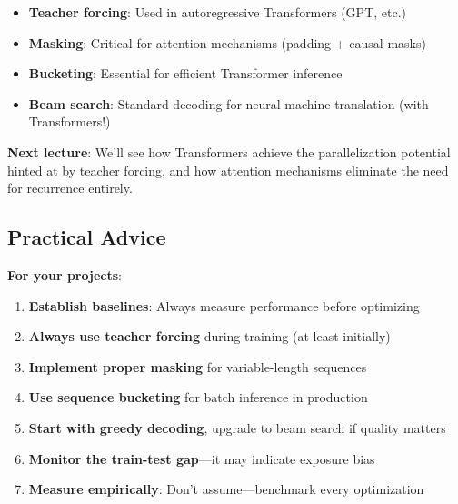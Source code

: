 \documentclass{article}
\begin{document}
\begin{tcolorbox}[colback=yellow!5!white, colframe=orange!50!black, title=Foundational Concepts]
\begin{itemize}
\item \textbf{Teacher forcing}: Used in autoregressive Transformers (GPT, etc.)
\item \textbf{Masking}: Critical for attention mechanisms (padding + causal masks)
\item \textbf{Bucketing}: Essential for efficient Transformer inference
\item \textbf{Beam search}: Standard decoding for neural machine translation (with Transformers!)
\end{itemize}

\textbf{Next lecture}: We'll see how Transformers achieve the parallelization potential hinted at by teacher forcing, and how attention mechanisms eliminate the need for recurrence entirely.
\end{tcolorbox}

\subsection{Practical Advice}

\textbf{For your projects}:
\begin{enumerate}
\item \textbf{Establish baselines}: Always measure performance before optimizing
\item \textbf{Always use teacher forcing} during training (at least initially)
\item \textbf{Implement proper masking} for variable-length sequences
\item \textbf{Use sequence bucketing} for batch inference in production
\item \textbf{Start with greedy decoding}, upgrade to beam search if quality matters
\item \textbf{Monitor the train-test gap}—it may indicate exposure bias
\item \textbf{Measure empirically}: Don't assume—benchmark every optimization
\end{enumerate}
\end{document}

